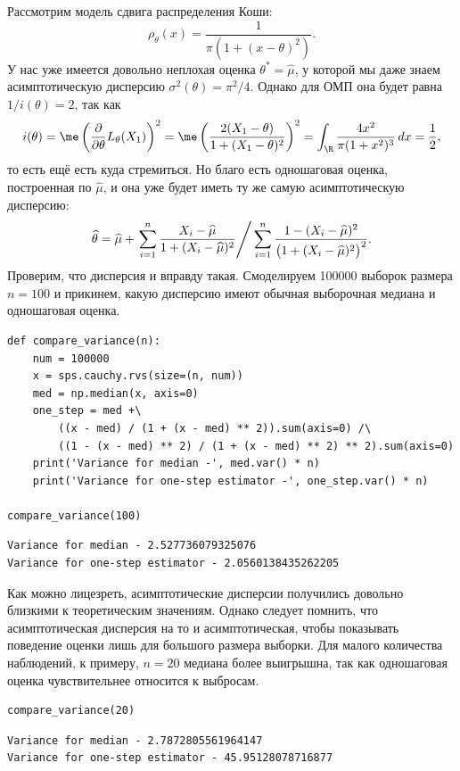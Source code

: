 \begin{example}
    Рассмотрим модель сдвига распределения Коши:
    \[
    \rho_{\theta}(x) = \frac{1}{\pi(1 + (x - \theta)^2)}.
    \]
    У нас уже имеется довольно неплохая оценка $\theta^* = \widehat{\mu}$, у которой мы даже знаем асимптотическую дисперсию $\sigma^2(\theta) = \pi^2/4$. Однако для ОМП она будет равна $1 / i(\theta) = 2$, так как
    \[
    i(\theta) = \me \left(\frac{\partial}{\partial \theta} L_{\theta}(X_1)\right)^2 = \me \left(\frac{2(X_1 - \theta)}{1 + (X_1 - \theta)^2}\right)^2 = \int_{\R} \frac{4x^2}{\pi(1+x^2)^3}\,dx = \frac{1}{2},
    \]
    то есть ещё есть куда стремиться. Но благо есть одношаговая оценка, построенная по $\widehat{\mu}$, и она уже будет иметь ту же самую асимптотическую дисперсию:
    \[
    \widehat{\theta} = \widehat{\mu} + \left.\sum_{i=1}^n \frac{X_i - \widehat{\mu}}{1 + (X_i - \widehat{\mu})^2} \right/ \sum_{i=1}^n \frac{1 - (X_i - \widehat{\mu})^2}{\bigl(1 + (X_i - \widehat{\mu})^2\bigr)^2}.
    \]
    Проверим, что дисперсия и вправду такая. Смоделируем 100000 выборок размера $n = 100$ и прикинем, какую дисперсию имеют обычная выборочная медиана и одношаговая оценка.
    \begin{verbatim}
def compare_variance(n):
    num = 100000
    x = sps.cauchy.rvs(size=(n, num))
    med = np.median(x, axis=0)
    one_step = med +\
        ((x - med) / (1 + (x - med) ** 2)).sum(axis=0) /\
        ((1 - (x - med) ** 2) / (1 + (x - med) ** 2) ** 2).sum(axis=0)
    print('Variance for median -', med.var() * n)
    print('Variance for one-step estimator -', one_step.var() * n)

compare_variance(100)
    \end{verbatim}
    \begin{lstlisting}
Variance for median - 2.527736079325076
Variance for one-step estimator - 2.0560138435262205
    \end{lstlisting}
    Как можно лицезреть, асимптотические дисперсии получились довольно близкими к теоретическим значениям. Однако следует помнить, что асимптотическая дисперсия на то и асимптотическая, чтобы показывать поведение оценки лишь для большого размера выборки. Для малого количества наблюдений, к примеру, $n=20$ медиана более выигрышна, так как одношаговая оценка чувствительнее относится к выбросам.
    \begin{verbatim}
compare_variance(20)
    \end{verbatim}
    \begin{lstlisting}
Variance for median - 2.7872805561964147
Variance for one-step estimator - 45.95128078716877
    \end{lstlisting}
\end{example}

